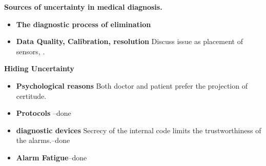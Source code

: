 \documentclass[12pt]{article}
\begin{document}

{\bf Sources of uncertainty in medical diagnosis.}
\begin{itemize}
  \item{\bf The diagnostic process of elimination}
  \item{\bf Data Quality, Calibration, resolution} Discuss issue as placement of sensors, .
  \end{itemize}

 {\bf Hiding Uncertainty}
  \begin{itemize}
    \item {\bf Psychological reasons} Both doctor and patient prefer
      the projection of certitude.
    \item {\bf Protocols} --done
    \item {\bf diagnostic devices} Secrecy of the internal code limits
      the trustworthiness of the alarms.--done
    \item{\bf Alarm Fatigue}--done
  \end{itemize}
\end{document}
